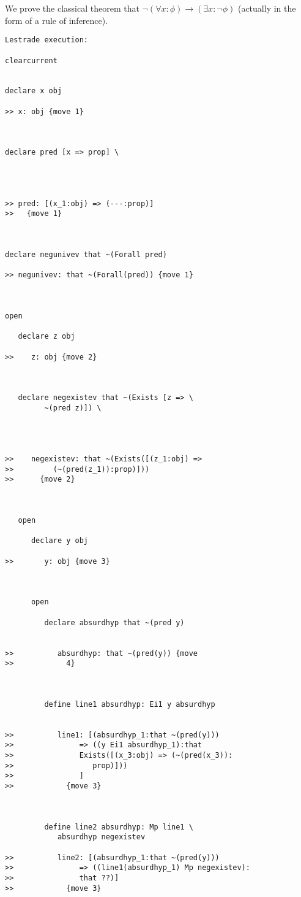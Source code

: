 \documentclass[12pt]{article}
\begin{document}
We prove the classical theorem that $\neg (\forall x:\phi) \rightarrow (\exists x:\neg\phi)$ (actually in the form of a rule of inference).

\begin{verbatim}Lestrade execution:

clearcurrent


declare x obj

>> x: obj {move 1}



declare pred [x => prop] \
   



>> pred: [(x_1:obj) => (---:prop)]
>>   {move 1}



declare negunivev that ~(Forall pred)

>> negunivev: that ~(Forall(pred)) {move 1}



open

   declare z obj

>>    z: obj {move 2}



   declare negexistev that ~(Exists [z => \
         ~(pred z)]) \
      



>>    negexistev: that ~(Exists([(z_1:obj) =>
>>         (~(pred(z_1)):prop)]))
>>      {move 2}



   open

      declare y obj

>>       y: obj {move 3}



      open

         declare absurdhyp that ~(pred y)


>>          absurdhyp: that ~(pred(y)) {move
>>            4}



         define line1 absurdhyp: Ei1 y absurdhyp


>>          line1: [(absurdhyp_1:that ~(pred(y)))
>>               => ((y Ei1 absurdhyp_1):that
>>               Exists([(x_3:obj) => (~(pred(x_3)):
>>                  prop)]))
>>               ]
>>            {move 3}



         define line2 absurdhyp: Mp line1 \
            absurdhyp negexistev

>>          line2: [(absurdhyp_1:that ~(pred(y)))
>>               => ((line1(absurdhyp_1) Mp negexistev):
>>               that ??)]
>>            {move 3}




\end{verbatim}
\end{document}
